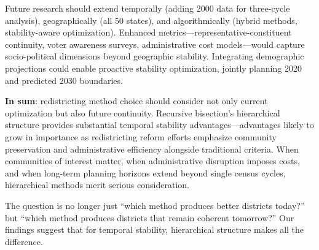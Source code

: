 Future research should extend temporally (adding 2000 data for three-cycle analysis), geographically (all 50 states), and algorithmically (hybrid methods, stability-aware optimization). Enhanced metrics—representative-constituent continuity, voter awareness surveys, administrative cost models—would capture socio-political dimensions beyond geographic stability. Integrating demographic projections could enable proactive stability optimization, jointly planning 2020 and predicted 2030 boundaries.

\textbf{In sum}: redistricting method choice should consider not only current optimization but also future continuity. Recursive bisection's hierarchical structure provides substantial temporal stability advantages—advantages likely to grow in importance as redistricting reform efforts emphasize community preservation and administrative efficiency alongside traditional criteria. When communities of interest matter, when administrative disruption imposes costs, and when long-term planning horizons extend beyond single census cycles, hierarchical methods merit serious consideration.

The question is no longer just ``which method produces better districts today?'' but ``which method produces districts that remain coherent tomorrow?'' Our findings suggest that for temporal stability, hierarchical structure makes all the difference.
